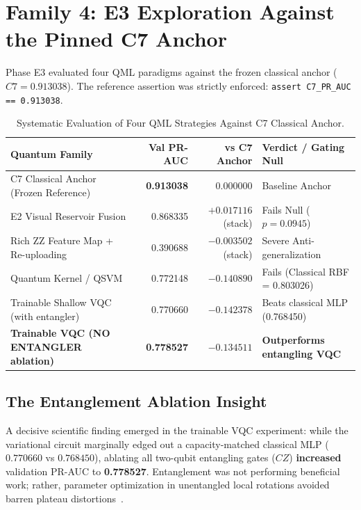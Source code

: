 \documentclass[11pt,a4paper]{report}
\begin{document}
\section{Family 4: E3 Exploration Against the Pinned C7 Anchor}
Phase E3 evaluated four QML paradigms against the frozen classical anchor ($C7 = 0.913038$). The reference assertion was strictly enforced: \nolinkurl{assert C7_PR_AUC == 0.913038}.

\begin{table}[H]
\centering
\footnotesize
\setlength{\tabcolsep}{3.5pt}
\begin{tabularx}{\textwidth}{>{\raggedright\arraybackslash}p{3.8cm} rr >{\raggedright\arraybackslash}X}
\toprule
\textbf{Quantum Family} & \textbf{Val PR-AUC} & \textbf{vs C7 Anchor} & \textbf{Verdict / Gating Null} \\
\midrule
C7 Classical Anchor (Frozen Reference) & \textbf{0.913038} & 0.000000 & Baseline Anchor \\
E2 Visual Reservoir Fusion & 0.868335 & $+0.017116$ (stack) & Fails Null ($p = 0.0945$) \\
Rich ZZ Feature Map + Re-uploading & 0.390688 & $-0.003502$ (stack) & Severe Anti-generalization \\
Quantum Kernel / QSVM & 0.772148 & $-0.140890$ & Fails (Classical RBF = 0.803026) \\
Trainable Shallow VQC (with entangler) & 0.770660 & $-0.142378$ & Beats classical MLP (0.768450) \\
\textbf{Trainable VQC (NO ENTANGLER ablation)} & \textbf{0.778527} & $-0.134511$ & \textbf{Outperforms entangling VQC} \\
\bottomrule
\end{tabularx}
\caption{Systematic Evaluation of Four QML Strategies Against C7 Classical Anchor.}
\label{tab:e3_qml_results}
\end{table}

\subsection{The Entanglement Ablation Insight}
A decisive scientific finding emerged in the trainable VQC experiment: while the variational circuit marginally edged out a capacity-matched classical MLP ($0.770660$ vs $0.768450$), ablating all two-qubit entangling gates ($CZ$) \textbf{increased} validation PR-AUC to \textbf{0.778527}. Entanglement was not performing beneficial work; rather, parameter optimization in unentangled local rotations avoided barren plateau distortions~\cite{mcclean2018barren}.
\end{document}
